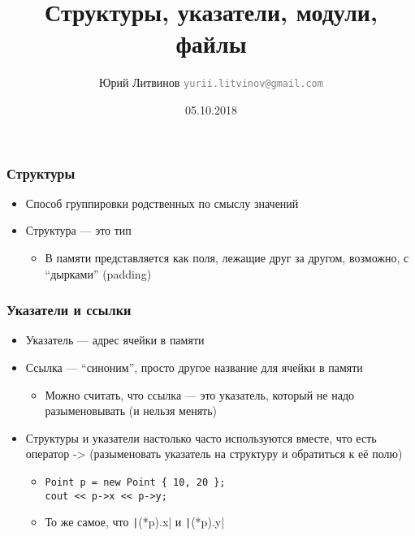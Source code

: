 \documentclass[xetex,mathserif,serif]{beamer}
\title{Структуры, указатели, модули, файлы}
\author[Юрий Литвинов]{Юрий Литвинов \newline \textcolor{gray}{\small\texttt{yurii.litvinov@gmail.com}}}
\date{05.10.2018}
\begin{document}
	
	\frame{\titlepage}
	
	\begin{frame}
		\frametitle{Структуры}
		\begin{itemize}
			\item Способ группировки родственных по смыслу значений
			\item Структура --- это тип
			\begin{itemize}
				\item В памяти представляется как поля, лежащие друг за другом, возможно, с ``дырками'' (padding)
			\end{itemize}
		\end{itemize}
	\end{frame}

	\begin{frame}[fragile]
		\frametitle{Указатели и ссылки}
		\begin{itemize}
			\item Указатель --- адрес ячейки в памяти
			\item Ссылка --- ``синоним'', просто другое название для ячейки в памяти
			\begin{itemize}
				\item Можно считать, что ссылка --- это указатель, который не надо разыменовывать (и нельзя менять)
			\end{itemize}
			\item Структуры и указатели настолько часто используются вместе, что есть оператор -> (разыменовать указатель на структуру и обратиться к её полю)
			\begin{itemize}
				\item 
				\begin{footnotesize}
					\begin{verbatim}
Point p = new Point { 10, 20 };
cout << p->x << p->y;
					\end{verbatim}
				\end{footnotesize}
				\item То же самое, что \texttt|(*p).x| и \texttt|(*p).y|
			\end{itemize}
		\end{itemize}
	\end{frame}
\end{document}
